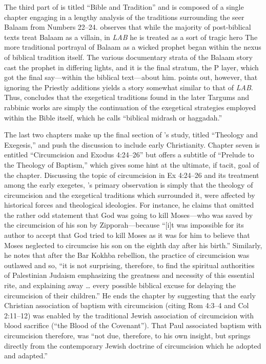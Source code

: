 The third part of  is titled ``Bible and Tradition'' and is composed of a single chapter engaging in a lengthy analysis of the traditions surrounding the seer Balaam from Numbers 22--24. \vermes observes that while the majority of post-biblical texts treat Balaam as a villain, in \emph{LAB} he is treated as a sort of tragic hero%
    \autocite[173]{vermes1961}
The more traditional portrayal of Balaam as a wicked prophet began within the nexus of biblical tradition itself. The various documentary strata of the Balaam story cast the prophet in differing lights, and it is the final stratum, the P layer, which got the final say---within the biblical text---about him.
%
%
\vermes points out, however, that ignoring the Priestly additions yields a story somewhat similar to that of \emph{LAB}. Thus, \vermes concludes that the exegetical traditions found in the later Targums and rabbinic works are simply the continuation of the exegetical strategies employed within the Bible itself, which he calls ``biblical midrash or haggadah.''%
    \autocite[176]{vermes1961}

The last two chapters make up the final section of \vermes's study, titled ``Theology and Exegesis,'' and push the discussion to include early Christianity. Chapter seven is entitled ``Circumcision and Exodus 4:24--26'' but offers a subtitle of ``Prelude to the Theology of Baptism,'' which gives some hint at the ultimate, if tacit, goal of the chapter. Discussing the topic of circumcision in Ex 4:24--26 and its treatment among the early exegetes, \vermes's primary observation is simply that the theology of circumcision and the exegetical traditions which surrounded it, were affected by historical forces and theological ideologies. For instance, he claims that \jub omitted the rather odd statement that God was going to kill Moses---who was saved by the circumcision of his son by Zipporah---because ``[i]t was impossible for its author to accept that God tried to kill Moses as it was for him to believe that Moses neglected to circumcise his son on the eighth day after his birth.''%
    \autocite[185]{vermes1961}
Similarly, he notes that after the Bar Kokhba rebellion, the practice of circumcision was outlawed and so, ``it is not surprising, therefore, to find the spiritual authorities of Palestinian Judaism emphasizing the greatness and necessity of this essential rite, and explaining away \ldots{} every possible biblical excuse for delaying the circumcision of their children.''%
    \autocite[189]{vermes1961}
He ends the chapter by suggesting that the early Christian association of baptism with circumcision (citing Rom 4:3--4 and Col 2:11--12) was enabled by the traditional Jewish association of circumcision with blood sacrifice (``the Blood of the Covenant'').%
    \autocite[190]{vermes1961}
That Paul associated baptism with circumcision therefore, was ``not due, therefore, to his own insight, but springs directly from the contemporary Jewish doctrine of circumcision which he adopted and adapted.''%
    \autocite[191]{vermes1961} 

